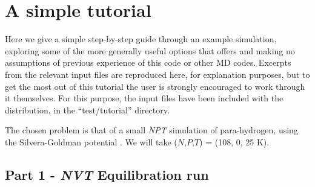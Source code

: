 \documentclass[11pt,english,fleqn]{report}
\begin{document}







%











































\chapter{A simple tutorial}

\label{tutorial}

Here we give a simple step-by-step guide through an example
simulation, exploring
some of the more generally useful options that \ipi offers and making
no assumptions of previous experience of this code or other MD codes.
Excerpts from the relevant input files are reproduced here, for explanation
purposes, but to get the most out of this tutorial the user is strongly encouraged
to work through it themselves. For this purpose, the input files
have been included with the \ipi distribution, in the {}``test/tutorial''
directory.

The chosen problem is that of a small \emph{NPT} simulation of para-hydrogen,
using the Silvera-Goldman potential \cite{silv-gold78jcp}.
We will take (\(N\),\(P\),\(T\)) = (108, 0, 25 K).

\section{Part 1 - \emph{NVT} Equilibration run}
\end{document}

